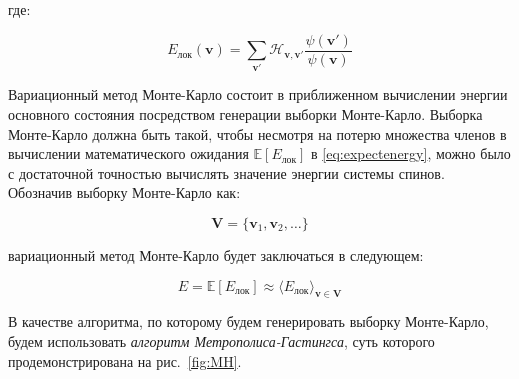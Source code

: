 \noindent где:

\begin{equation}
E_{\text{лок}}(\mathbf{v})=\sum_{\mathbf{v}'}\mathcal{H}_{\mathbf{v},\mathbf{v}'}\frac{\psi(\mathbf{v}')}{\psi(\mathbf{v})}
\end{equation}

Вариационный метод Монте-Карло состоит в приближенном вычислении энергии основного состояния посредством генерации выборки Монте-Карло.
Выборка Монте-Карло должна быть такой, чтобы несмотря на потерю множества членов в вычислении математического ожидания $\mathbb{E}[E_{\text{лок}}]$ в \eqref{eq:expectenergy}, можно было с достаточной точностью вычислять значение энергии системы спинов.
Обозначив выборку Монте-Карло как:

\[
\mathbf{V}=\{\mathbf{v}_1,\mathbf{v}_2,\dots\}
\]

\noindent вариационный метод Монте-Карло будет заключаться в следующем:

\begin{equation}\label{eq:VMC}
E=\mathbb{E}[E_{\text{лок}}]\approx\langle E_{\text{лок}}\rangle_{\mathbf{v}\in \mathbf{V}}
\end{equation}

В качестве алгоритма, по которому будем генерировать выборку Монте-Карло, будем использовать \textit{алгоритм Метрополиса-Гастингса}, суть которого продемонстрирована на рис.~\ref{fig:MH}.

